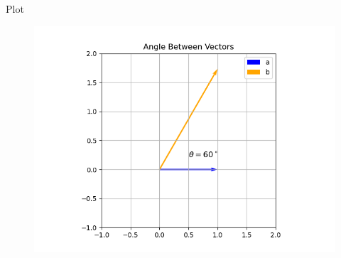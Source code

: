 \documentclass{beamer}
\begin{document}
\begin{frame}{Plot}
    \begin{figure}[H]
        \centering
        \includegraphics[width=0.7\linewidth]{../figs/Figure_1.png}
        \caption{}
        \label{fig:fig1}
    \end{figure}
\end{frame}
\end{document}
